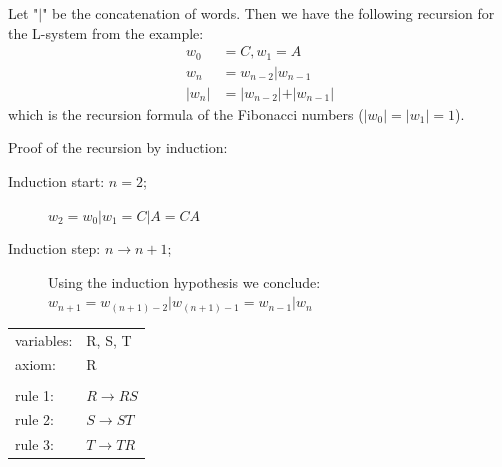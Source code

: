\documentclass[10pt,a4paper,boxed]{hmcpset}
\begin{document}
\begin{problem}[Assignment 27]
\end{problem}
\begin{solution}
Let "$\vert$" be the concatenation of words. Then we have the following recursion for the L-system from the example:\\
\begin{align*}
	w_0 & = C, w_1 = A\\
	w_n & = w_{n-2} \vert w_{n-1} \\
	\vert w_n \vert & = \vert w_{n-2} \vert + \vert w_{n-1} \vert
\end{align*}
which is the recursion formula of the Fibonacci numbers ($\vert w_0 \vert = \vert w_1 \vert = 1$).

Proof of the recursion by induction:
	\begin{description}
		\item[Induction start: $n=2$;] $w_2 = w_0 \vert w_1 = C \vert A = CA$
		\item[Induction step: $n \rightarrow n+1$;] Using the induction hypothesis we conclude: $w_{n+1} = w_{(n+1)-2} \vert w_{(n+1)-1} = w_{n-1} \vert w_n$
	\end{description}
\end{solution}

\begin{problem}[Assignment 28]
\end{problem}
\begin{solution}
	\begin{tabular}{ll}
	 variables: & R, S, T\\ 
	 axiom: & R \\
	 		& \\
	 rule 1: & $R \rightarrow RS$ \\
	 rule 2: & $S \rightarrow ST$ \\
	 rule 3: & $T \rightarrow TR$ \\
	\end{tabular}
\end{solution}

\newpage
\end{document}
